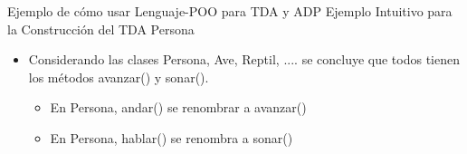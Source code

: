 \documentclass[10pt,envcountsect,spanish]{beamer}
\begin{document}
\begin{frame}[fragile]{Ejemplo de cómo usar Lenguaje-POO para TDA y ADP} {Ejemplo Intuitivo para la Construcción del TDA Persona}
\begin{itemize}
\begin{itemize}
\item Considerando las clases Persona, Ave, Reptil, .... se concluye que todos tienen los métodos avanzar() y sonar().

\begin{itemize}
\item En Persona, andar() se renombrar a avanzar()
\item En Persona, hablar() se renombra a sonar()
\end{itemize}
\end{itemize}


\end{itemize}
\end{frame}
\end{document}
